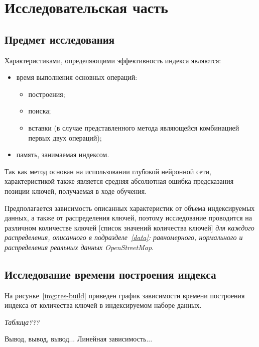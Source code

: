 \chapter{\label{research}Исследовательская часть}

\section{Предмет исследования}

Характеристиками, определяющими эффективность индекса являются:

\begin{itemize}
    \item время выполнения основных операций:
\begin{itemize}
    \item построения;
    \item поиска;
    \item вставки (в случае представленного метода являющейся
        комбинацией первых двух операций);
\end{itemize}
    \item память, занимаемая индексом.
\end{itemize}

Так как метод основан на использовании глубокой нейронной сети,
характеристикой также является средняя абсолютная ошибка предсказания позиции
ключей, получаемая в ходе обучения.

Предполагается зависимость описанных характеристик от объема индексируемых
данных, а также от распределения ключей, поэтому исследование проводится на
различном количестве ключей [список значений количества ключей] \textit{для
каждого распределения, описанного в подразделе~\ref{data}: равномерного,
нормального и распределения реальных данных OpenStreetMap}.

\section{Исследование времени построения индекса}

На рисунке~\ref{img:res-build} приведен график зависимости времени построения
индекса от количества ключей в индексируемом наборе данных.

\textit{Таблица???}


Вывод, вывод, вывод... Линейная зависимость...

